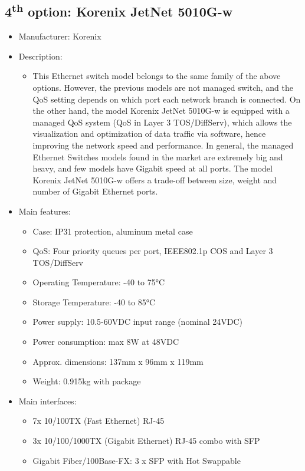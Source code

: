 \subsection{4\textsuperscript{th} option: Korenix JetNet 5010G-w} \label{DEVICE:ETHERNETSWITCH5010G}
\begin{itemize}
  \item Manufacturer: Korenix
  \item Description:
  \begin{itemize}
    \item This Ethernet switch model belongs to the same family of the above options. However, the previous models are not managed switch, and the QoS setting depends on which port each network branch is connected. On the other hand, the model Korenix JetNet 5010G-w is equipped with a managed QoS system (QoS in Layer 3 TOS/DiffServ), which allows the visualization and optimization of data traffic via software, hence improving the network speed and performance. In general, the managed Ethernet Switches models found in the market are extremely big and heavy, and few models have Gigabit speed at all ports. The model Korenix JetNet 5010G-w offers a trade-off between size, weight and number of Gigabit Ethernet ports.
  \end{itemize}
  \item Main features:
  \begin{itemize}
    \item Case: IP31 protection, aluminum metal case
    \item QoS: Four priority queues per port, IEEE802.1p COS and Layer 3 TOS/DiffServ
    \item Operating Temperature: -40 to 75°C
    \item Storage Temperature: -40 to 85°C
    \item Power supply: 10.5-60VDC input range (nominal 24VDC)
    \item Power consumption: max 8W at 48VDC
    \item Approx. dimensions: 137mm x 96mm x 119mm
    \item Weight: 0.915kg with package
  \end{itemize}
  \item Main interfaces:
  \begin{itemize}
    \item 7x 10/100TX (Fast Ethernet) RJ-45
    \item 3x 10/100/1000TX (Gigabit Ethernet) RJ-45 combo with SFP
    \item Gigabit Fiber/100Base-FX: 3 x SFP with Hot Swappable

\end{itemize}
\end{itemize}
